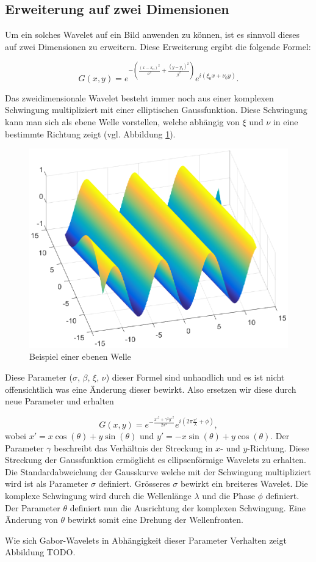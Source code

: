 \subsection{Erweiterung auf zwei Dimensionen}

Um ein solches Wavelet auf ein Bild anwenden zu können, ist es sinnvoll dieses auf zwei Dimensionen zu erweitern.
Diese Erweiterung ergibt die folgende Formel:

\begin{equation}
G(x,y)= e^{-(\frac{(x-x_{0})^{2}}{\sigma^{2}}+\frac{(y-y_{0})^{2}}{\beta^{2}})}
e^{i(\xi_{0}x+\nu_{0}y)}.
\end{equation}

Das zweidimensionale Wavelet besteht immer noch aus einer komplexen Schwingung multipliziert mit einer elliptischen Gaussfunktion. 
Diese Schwingung kann man sich als ebene Welle vorstellen, welche abhängig von $\xi$ und $\nu$ in eine bestimmte Richtung zeigt (vgl. Abbildung \ref{fig:planarwave}).

\begin{figure}
	\centering
	\includegraphics[width=0.7\linewidth]{./papers/visuell/images/planarwave.eps}
	\caption{Beispiel einer ebenen Welle}
	\label{fig:planarwave}
\end{figure}



Diese Parameter ($\sigma$, $\beta$, $\xi$, $\nu$) dieser Formel sind unhandlich und es ist nicht offensichtlich was eine Änderung dieser bewirkt.
Also ersetzen wir diese durch neue Parameter und erhalten 

\begin{equation}
G(x,y)=e^{-\frac{x'^{2}+\gamma^{2}y'^{2}}{2\sigma^{2}}}
e^{i(2\pi\frac{x'}{\lambda} + \phi)},
\end{equation} 
wobei $x'=x\cos(\theta)+y\sin(\theta)$ und $y'=-x\sin(\theta)+y\cos(\theta)$.
Der Parameter $\gamma$ beschreibt das Verhältnis der Streckung in $x$- und $y$-Richtung.
Diese Streckung der Gaussfunktion ermöglicht es ellipsenförmige Wavelets zu erhalten.
Die Standardabweichung der Gausskurve welche mit der Schwingung multipliziert wird ist als Parameter $\sigma$ definiert.
Grösseres $\sigma$ bewirkt ein breiteres Wavelet.
Die komplexe Schwingung wird durch die Wellenlänge $\lambda$ und die Phase $\phi$ definiert.
Der Parameter $\theta$ definiert nun die Ausrichtung der komplexen Schwingung.
Eine Änderung von $\theta$  bewirkt somit eine Drehung der Wellenfronten.

Wie sich Gabor-Wavelets in Abhängigkeit dieser Parameter Verhalten zeigt Abbildung TODO. %
